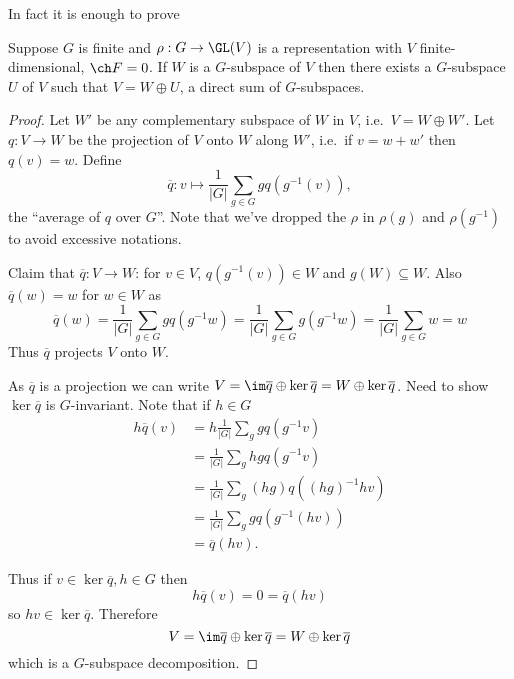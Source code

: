 \documentclass[a4paper]{article}
\begin{document}
In fact it is enough to prove

\begin{theorem}[Maschke]
  \label{thm:Maschke}
  Suppose \(G\) is finite and \(\rho: G \to \GL(V)\) is a representation with \(V\) finite-dimensional, \(\ch F = 0\). If \(W\) is a \(G\)-subspace of \(V\) then there exists a \(G\)-subspace \(U\) of \(V\) such that \(V = W \oplus U\), a direct sum of \(G\)-subspaces.
\end{theorem}

\begin{proof}
  Let \(W'\) be any complementary subspace of \(W\) in \(V\), i.e.\ \(V = W \oplus W'\). Let \(q: V \to W\) be the projection of \(V\) onto \(W\) along \(W'\), i.e.\ if \(v = w + w'\) then \(q(v) = w\). Define
  \[
    \overline q: v \mapsto \frac{1}{|G|} \sum_{g \in G} g q(g^{-1}(v)),
  \]
  the ``average of \(q\) over \(G\)''. Note that we've dropped the \(\rho\) in \(\rho(g)\) and \(\rho(g^{-1})\) to avoid excessive notations.

  Claim that \(\overline q: V \to W\): for \(v \in V\), \(q(g^{-1}(v)) \in W\) and \(g(W) \subseteq W\). Also \(\overline q(w) = w\) for \(w \in W\) as
  \[
    \overline q(w)
    = \frac{1}{|G|} \sum_{g \in G} g q(g^{-1}w)
    = \frac{1}{|G|} \sum_{g \in G} g (g^{-1}w)
    = \frac{1}{|G|} \sum_{g \in G} w
    = w
  \]
  Thus \(\overline q\) projects \(V\) onto \(W\).

  As \(\overline q\) is a projection we can write \(V = \im \overline q \oplus \ker \overline q = W \oplus \ker \overline q\). Need to show \(\ker \overline q\) is \(G\)-invariant. Note that if \(h \in G\)
  \begin{align*}
    h \overline q(v)
    &= h \frac{1}{|G|} \sum_g g q(g^{-1}v) \\
    &= \frac{1}{|G|} \sum_g hg q(g^{-1}v) \\
    &= \frac{1}{|G|} \sum_g (hg) q((hg)^{-1} hv) \\
    &= \frac{1}{|G|} \sum_g g q(g^{-1}(hv)) \\
    &= \overline q(hv).
  \end{align*}

  Thus if \(v \in \ker \overline q, h \in G\) then
  \[
    h\overline q(v) = 0 = \overline q(hv)
  \]
  so \(hv \in \ker \overline q\). Therefore
  \[
    V = \im \overline q \oplus \ker \overline q = W \oplus \ker \overline q
  \]
  which is a \(G\)-subspace decomposition.
\end{proof}
\end{document}

